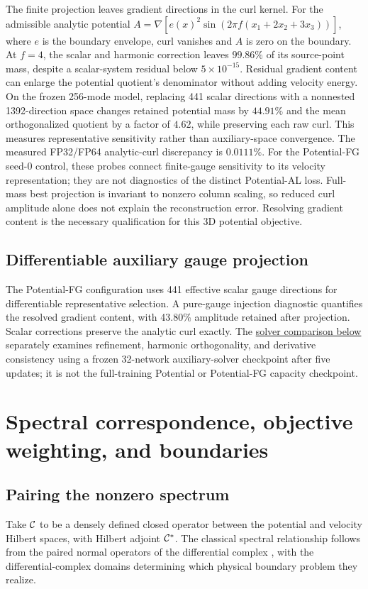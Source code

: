 The finite projection leaves gradient directions in the curl kernel. For the admissible analytic potential $A=\nabla[e(x)^2\sin(2\pi f(x_1+2x_2+3x_3))]$, where $e$ is the boundary envelope, curl vanishes and $A$ is zero on the boundary. At $f=4$, the scalar and harmonic correction leaves $99.86\%$ of its source-point mass, despite a scalar-system residual below $5\times10^{-15}$. Residual gradient content can enlarge the potential quotient's denominator without adding velocity energy. On the frozen 256-mode model, replacing 441 scalar directions with a nonnested 1392-direction space changes retained potential mass by $44.91\%$ and the mean orthogonalized quotient by a factor of $4.62$, while preserving each raw curl. This measures representative sensitivity rather than auxiliary-space convergence. The measured FP32/FP64 analytic-curl discrepancy is $0.0111\%$. For the Potential-FG seed-0 control, these probes connect finite-gauge sensitivity to its velocity representation; they are not diagnostics of the distinct Potential-AL loss. Full-mass best projection is invariant to nonzero column scaling, so reduced curl amplitude alone does not explain the reconstruction error. Resolving gradient content is the necessary qualification for this 3D potential objective.

\subsection{Differentiable auxiliary gauge projection}
The Potential-FG configuration uses 441 effective scalar gauge directions for differentiable representative selection. A pure-gauge injection diagnostic quantifies the resolved gradient content, with 43.80\% amplitude retained after projection. Scalar corrections preserve the analytic curl exactly. The \hyperref[app:gauge-solvers]{solver comparison below} separately examines refinement, harmonic orthogonality, and derivative consistency using a frozen 32-network auxiliary-solver checkpoint after five updates; it is not the full-training Potential or Potential-FG capacity checkpoint.



\section{Spectral correspondence, objective weighting, and boundaries}
\label{app:spectrum}
\subsection{Pairing the nonzero spectrum}
Take $\mathcal C$ to be a densely defined closed operator between the potential and velocity Hilbert spaces, with Hilbert adjoint $\mathcal C^*$. {The classical spectral relationship follows from the paired normal operators of the differential complex \citep{arnold2006finite}, with the differential-complex domains determining which physical boundary problem they realize.}

